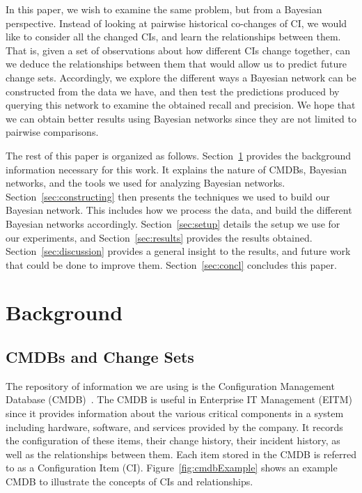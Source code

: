\documentclass[10pt,twocolumn,letterpaper]{article}
\begin{document}
In this paper, we wish to examine the same problem, but from a Bayesian perspective. Instead of looking at pairwise historical co-changes of CI, we would like
to consider all the changed CIs, and learn the relationships between them. That is, given a set of observations about how different CIs change
together, can we deduce the relationships between them that would allow us to predict future change sets. Accordingly, we explore the different ways a Bayesian
network can be constructed from the data we have, and then test the predictions produced by querying this network to examine the obtained recall and precision.
We hope that we can obtain better results using Bayesian networks since they are not limited to pairwise comparisons. 

The rest of this paper is organized as follows. Section~\ref{sec:bg} provides the background information necessary for this work. It explains the nature of
CMDBs, Bayesian networks, and the tools we used for analyzing Bayesian networks. Section~\ref{sec:constructing} then presents the techniques we used to build
our Bayesian network. This includes how we process the data, and build the different Bayesian networks accordingly. Section~\ref{sec:setup} details the
setup we use for our experiments, and Section~\ref{sec:results} provides the results obtained. Section~\ref{sec:discussion} provides a general insight to the
results, and future work that could be done to improve them. Section~\ref{sec:concl} concludes this paper.


\section{Background}
\label{sec:bg}

\subsection{CMDBs and Change Sets}
The repository of information we are using is the Configuration Management Database (CMDB)~\cite{itil}. The CMDB is useful in Enterprise IT Management (EITM)
since it provides information about the various critical components in a system including hardware, software, and services provided by the company. It records
the configuration of these items, their change history, their incident history, as well as the relationships between them. Each item stored in the CMDB is
referred to as a Configuration Item (CI). Figure~\ref{fig:cmdbExample} shows an example CMDB to illustrate the concepts of CIs and relationships.
\end{document}
